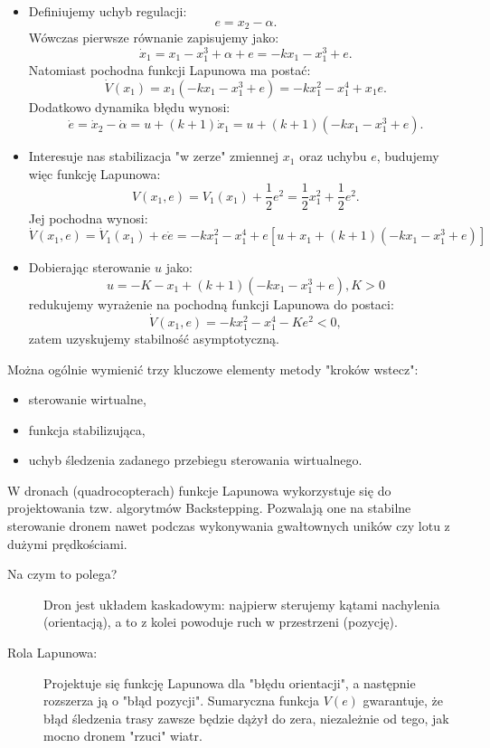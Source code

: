 \documentclass{article}
\begin{document}
\begin{tcolorbox}[colback=green!5, colframe=green!75!black, title=Przykład]
\begin{itemize}
        \item Definiujemy uchyb regulacji:
        $$
            e = x_{2} - \alpha.
        $$
        Wówczas pierwsze równanie zapisujemy jako:
        $$
            \dot{x}_{1} = x_{1} - x_{1}^{3} + \alpha + e = -kx_{1} - x_{1}^{3} + e.
        $$
        Natomiast pochodna funkcji Lapunowa ma postać:
        $$
            \dot{V}(x_{1}) = x_{1}(-kx_{1} - x_{1}^{3} + e) = -kx_{1}^2 - x_{1}^{4} + x_{1}e.
        $$
        Dodatkowo dynamika błędu wynosi:
        $$
            \dot{e} = \dot{x}_{2} - \dot{\alpha} = u + (k+1)\dot{x}_{1} = u + (k+1)(-kx_{1} - x_{1}^{3} + e).
        $$
        \item Interesuje nas stabilizacja "w zerze" zmiennej $x_{1}$ oraz uchybu $e$, budujemy więc funkcję Lapunowa:
        $$
            V(x_{1}, e) = V_{1}(x_{1}) + \frac{1}{2}e^{2} = \frac{1}{2}x_{1}^2 + \frac{1}{2}e^{2}.
        $$
        Jej pochodna wynosi:
        $$
        \dot{V}(x_{1}, e) = \dot{V}_{1}(x_{1}) + e\dot{e} = -kx_{1}^2 - x_{1}^{4}+e \left[ u + x_{1} + (k+1)(-kx_{1} - x_{1}^{3} + e) \right]
        $$
        \item Dobierając sterowanie $u$ jako:
        $$
            u = -K - x_{1} + (k+1)(-kx_{1} - x_{1}^{3} + e), K>0
        $$
        redukujemy wyrażenie na pochodną funkcji Lapunowa do postaci:
        $$
            \dot{V}(x_{1}, e) = - kx_{1}^{2} - x_{1}^{4} - Ke^{2} < 0,
        $$
        zatem uzyskujemy stabilność asymptotyczną.
    \end{itemize}
    \end{tcolorbox}
    Można ogólnie wymienić trzy kluczowe elementy metody "kroków wstecz":
    \begin{itemize}
        \item sterowanie wirtualne,
        \item funkcja stabilizująca,
        \item uchyb śledzenia zadanego przebiegu sterowania wirtualnego.
    \end{itemize}

    \begin{tcolorbox}[colback=magenta!5, colframe=magenta!75!black, title=Zastosowanie w robotyce]
        W dronach (quadrocopterach) funkcje Lapunowa wykorzystuje się do projektowania tzw. algorytmów Backstepping. Pozwalają one na stabilne sterowanie dronem nawet podczas wykonywania gwałtownych uników czy lotu z dużymi prędkościami.
        \begin{description}
            \item [Na czym to polega?] Dron jest układem kaskadowym: najpierw sterujemy kątami nachylenia (orientacją), a to z kolei powoduje ruch w przestrzeni (pozycję).
            \item[Rola Lapunowa:] Projektuje się funkcję Lapunowa dla "błędu orientacji", a następnie rozszerza ją o "błąd pozycji". Sumaryczna funkcja $V(e)$ gwarantuje, że błąd śledzenia trasy zawsze będzie dążył do zera, niezależnie od tego, jak mocno dronem "rzuci" wiatr.
        \end{description}
    \end{tcolorbox}
    
\end{document}
